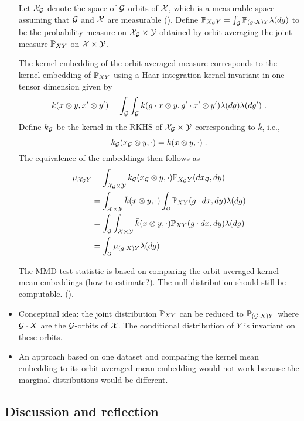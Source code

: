 \begin{itemize}
Let $\calX_\calG$ denote the space of $\calG$-orbits of $\calX$, which is a measurable space assuming that $\calG$ and $\calX$ are measurable (\todo). Define $\P_{X_\calG Y}=\int_{\calG}\bbP_{(g\cdot X)Y}\lambda(dg)$ to be the probability measure on $\calX_\calG\times\calY$ obtained by orbit-averaging the joint measure $\P_{XY}$ on $\calX\times\calY$.

The kernel embedding of the orbit-averaged measure corresponds to the kernel embedding of $\P_{XY}$ using a Haar-integration kernel \parencite{Haasdonk:2005} invariant in one tensor dimension given by
\[
\bar{k}(x\otimes y,x'\otimes y')=\int_\calG\int_\calG k(g\cdot x\otimes y, g'\cdot x'\otimes y')\lambda(dg)\lambda(dg')\;.
\]
Define $k_\calG$ be the kernel in the RKHS of $\calX_\calG\times\calY$ corresponding to $\bar{k}$, i.e.,
\[
k_\calG(x_\calG\otimes y,\cdot) = \bar{k}(x\otimes y,\cdot)\;.
\]
The equivalence of the embeddings then follows as
\begin{align*}
\mu_{\calX_\calG Y} &= \int_{\calX_\calG\times\calY}k_\calG(x_\calG\otimes y,\cdot)\P_{X_\calG Y}(dx_\calG,dy) \\
&= \int_{\calX\times\calY}\bar{k}(x\otimes y,\cdot)\int_\calG\bbP_{XY}(g\cdot dx,dy)\lambda(dg) \\
&= \int_\calG\int_{\calX\times\calY}\bar{k}(x\otimes y,\cdot)\bbP_{XY}(g\cdot dx,dy)\lambda(dg) \\
&= \int_\calG\mu_{(g\cdot X)Y}\lambda(dg)\;.
\end{align*}

The MMD test statistic is based on comparing the orbit-averaged kernel mean embeddings (\todo how to estimate?). The null distribution should still be computable. (\todo).

\item
Conceptual idea: the joint distribution $\bbP_{XY}$ can be reduced to $\bbP_{(\calG\cdot X)Y}$ where $\calG\cdot X$ are the $\calG$-orbits of $\calX$. The conditional distribution of $Y$ is invariant on these orbits.

\item
An approach based on one dataset and comparing the kernel mean embedding to its orbit-averaged mean embedding would not work because the marginal distributions would be different.

\end{itemize}


\subsection{Discussion and reflection} \label{sec:discussion}